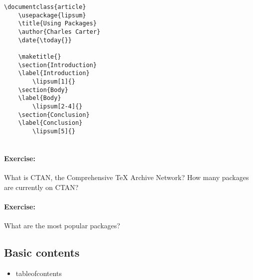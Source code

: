        \begin{verbatim}
\documentclass{article}
    \usepackage{lipsum}
    \title{Using Packages}
    \author{Charles Carter}
    \date{\today{}}
 
    \maketitle{}
    \section{Introduction}
    \label{Introduction}
        \lipsum[1]{}
    \section{Body}
    \label{Body}
        \lipsum[2-4]{}
    \section{Conclusion}
    \label{Conclusion}
        \lipsum[5]{}
    
        \end{verbatim}

        \paragraph{Exercise:}What is CTAN, the Comprehensive \TeX{} Archive Network? How many packages are currently on CTAN?

        \paragraph{Exercise:}What are the most popular \Lx{} packages?

        \subsection{Basic contents}
        \label{Basic contents}
        
        \begin{cmd}
            \begin{itemize}
                \item{tableofcontents}
            \end{itemize}
        \end{cmd}

